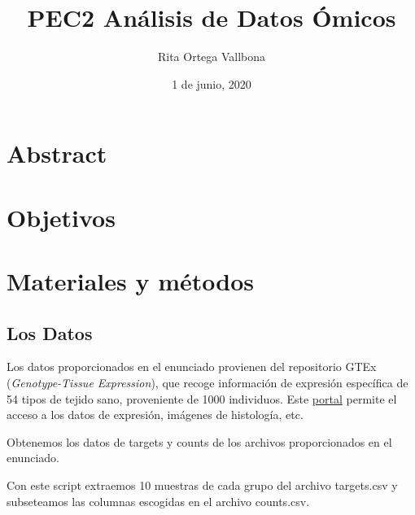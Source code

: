 \documentclass[
  english,
]{article}
\title{PEC2 Análisis de Datos Ómicos}
\author{Rita Ortega Vallbona}
\date{1 de junio, 2020}
\begin{document}
\maketitle

{
\setcounter{tocdepth}{3}
\tableofcontents
}
\hypertarget{abstract}{%
\section{Abstract}\label{abstract}}

\hypertarget{objetivos}{%
\section{Objetivos}\label{objetivos}}

\hypertarget{materiales-y-muxe9todos}{%
\section{Materiales y métodos}\label{materiales-y-muxe9todos}}

\hypertarget{los-datos}{%
\subsection{Los Datos}\label{los-datos}}

Los datos proporcionados en el enunciado provienen del repositorio GTEx
(\emph{Genotype-Tissue Expression}), que recoge información de expresión
específica de 54 tipos de tejido sano, proveniente de 1000 individuos.
Este \href{https://www.gtexportal.org/home/}{portal} permite el acceso a
los datos de expresión, imágenes de histología, etc.

Obtenemos los datos de targets y counts de los archivos proporcionados
en el enunciado.

Con este script extraemos 10 muestras de cada grupo del archivo
targets.csv y subseteamos las columnas escogidas en el archivo
counts.csv.
\end{document}
